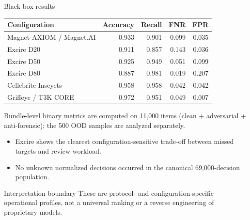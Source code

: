 \documentclass{beamer}
\begin{document}
\begin{frame}[shrink=3]{Black-box results}

\begin{table}
\centering
\scriptsize
\begin{tabular}{@{}lrrrr@{}}
\toprule
\textbf{Configuration} & \textbf{Accuracy} & \textbf{Recall} & \textbf{FNR} & \textbf{FPR} \\
\midrule
Magnet AXIOM / Magnet.AI & 0.933 & 0.901 & 0.099 & 0.035 \\
Excire D20 & 0.911 & 0.857 & 0.143 & 0.036 \\
Excire D50 & 0.925 & 0.949 & 0.051 & 0.099 \\
Excire D80 & 0.887 & 0.981 & 0.019 & 0.207 \\
Cellebrite Inseyets & 0.958 & 0.958 & 0.042 & 0.042 \\
Griffeye / T3K CORE & 0.972 & 0.951 & 0.049 & 0.007 \\
\bottomrule
\end{tabular}
\end{table}

{\scriptsize
Bundle-level binary metrics are computed on 11,000 items
(clean + adversarial + anti-forensic); the 500 OOD samples
are analyzed separately.
}

\begin{itemize}
    \item Excire shows the clearest configuration-sensitive trade-off between missed targets and review workload.
    \item No unknown normalized decisions occurred in the canonical 69,000-decision population.
\end{itemize}

\begin{block}{Interpretation boundary}
These are protocol- and configuration-specific operational profiles, not a universal ranking or a reverse engineering of proprietary models.
\end{block}

\end{frame}

\end{document}
